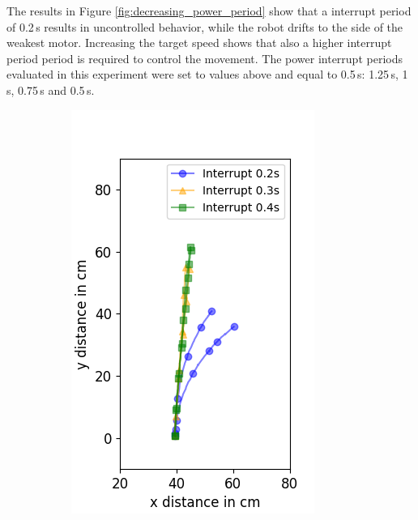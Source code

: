 The results in Figure \ref{fig:decreasing_power_period} show that a interrupt period of 0.2\,s results in uncontrolled behavior, while the robot drifts to the side of the weakest motor.
Increasing the target speed shows that also a higher interrupt period period is required to control the movement. 
The power interrupt periods evaluated in this experiment were set to values above and equal to 0.5\,s: 1.25\,s, 1\,s, 0.75\,s and 0.5\,s.


\begin{figure}
	\begin{subfigure}[b]{0.32\textwidth}
		\includegraphics[width=\textwidth]{pics/figure_40.png}

\end{subfigure}
\end{figure}
